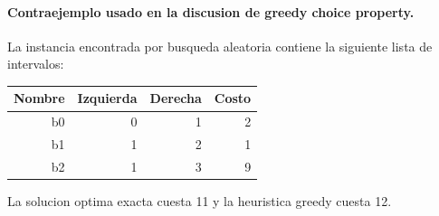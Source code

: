 \paragraph{Contraejemplo usado en la discusion de greedy choice property.} La instancia encontrada por busqueda aleatoria contiene la siguiente lista de intervalos:

\begin{tabular}{rrrr}
\toprule
Nombre & Izquierda & Derecha & Costo \\
\midrule
b0 & 0 & 1 & 2 \\
b1 & 1 & 2 & 1 \\
b2 & 1 & 3 & 9 \\
\bottomrule
\end{tabular}

La solucion optima exacta cuesta 11 y la heuristica greedy cuesta 12.

